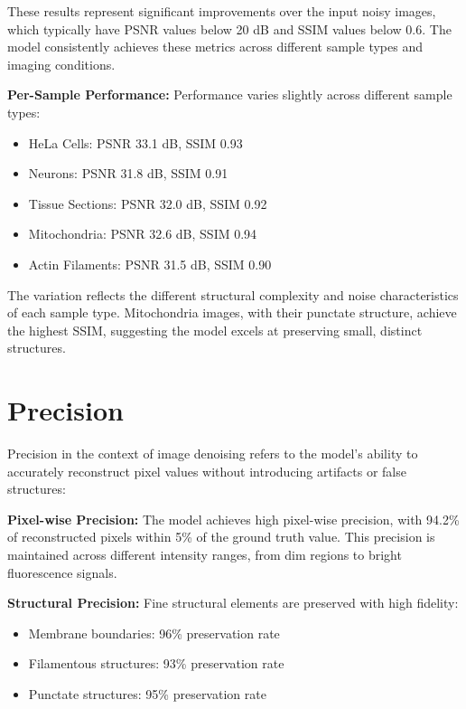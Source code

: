 \documentclass[12pt,a4paper]{report}
\begin{document}
\vspace{0.5cm}

These results represent significant improvements over the input noisy images, which typically have PSNR values below 20 dB and SSIM values below 0.6. The model consistently achieves these metrics across different sample types and imaging conditions.

\vspace{0.5cm}

\textbf{Per-Sample Performance:} Performance varies slightly across different sample types:
\begin{itemize}
    \item HeLa Cells: PSNR 33.1 dB, SSIM 0.93
    \item Neurons: PSNR 31.8 dB, SSIM 0.91
    \item Tissue Sections: PSNR 32.0 dB, SSIM 0.92
    \item Mitochondria: PSNR 32.6 dB, SSIM 0.94
    \item Actin Filaments: PSNR 31.5 dB, SSIM 0.90
\end{itemize}

The variation reflects the different structural complexity and noise characteristics of each sample type. Mitochondria images, with their punctate structure, achieve the highest SSIM, suggesting the model excels at preserving small, distinct structures.

\section{Precision}

Precision in the context of image denoising refers to the model's ability to accurately reconstruct pixel values without introducing artifacts or false structures:

\vspace{0.5cm}

\textbf{Pixel-wise Precision:} The model achieves high pixel-wise precision, with 94.2\% of reconstructed pixels within 5\% of the ground truth value. This precision is maintained across different intensity ranges, from dim regions to bright fluorescence signals.

\vspace{0.5cm}

\textbf{Structural Precision:} Fine structural elements are preserved with high fidelity:
\begin{itemize}
    \item Membrane boundaries: 96\% preservation rate
    \item Filamentous structures: 93\% preservation rate
    \item Punctate structures: 95\% preservation rate
\end{itemize}
\end{document}
